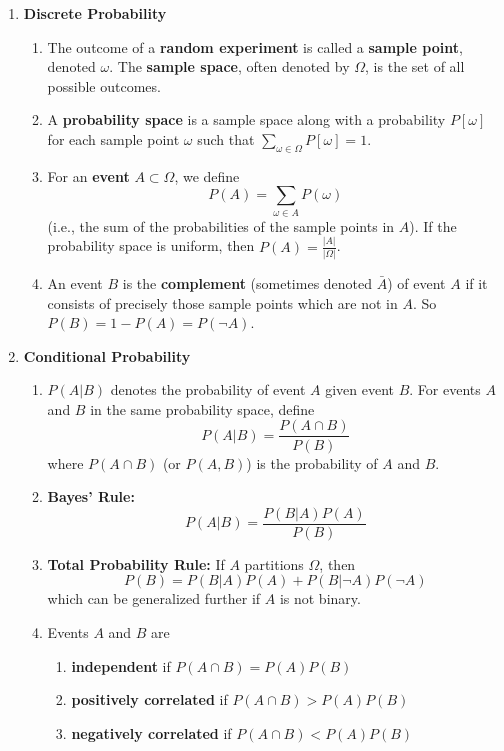 \documentclass[10pt]{article}
\begin{document}
\begin{multicols}{2}
\begin{enumerate}
\begin{enumerate}
        \end{enumerate}
        \item \textbf{Discrete Probability} 
        \begin{enumerate}
            \item The outcome of a \textbf{random experiment} is called a \textbf{sample point}, denoted $\omega$. The \textbf{sample space}, often denoted by $\Omega$, is the set of all possible outcomes.
            \item A \textbf{probability space} is a sample space along with a probability $P[\omega]$ for each sample point $\omega$ such that $\sum_{\omega \in \Omega} P[\omega]=1$.
            \item For an \textbf{event} $A \subset \Omega$, we define 
            $$P(A)=\sum_{\omega \in A} P(\omega)$$
            (i.e., the sum of the probabilities of the sample points in $A$). If the probability space is uniform, then $P(A)=\frac{|A|}{|\Omega|}$.
            \item An event $B$ is the \textbf{complement} (sometimes denoted $\bar{A}$) of event $A$ if it consists of precisely those sample points which are not in $A$. So $P(B) = 1 - P(A) = P(\neg A)$. 
        \end{enumerate}
        \item \textbf{Conditional Probability}
        \begin{enumerate}
            \item $P(A|B)$ denotes the probability of event $A$ given event $B$. For events $A$ and $B$ in the same probability space, define 
            $$P(A|B) = \frac{P(A \cap B)}{P(B)}$$
            where $P(A \cap B)$ (or $P(A,B)$) is the probability of $A$ and $B$.
            \item \textbf{Bayes' Rule:} $$P(A|B) = \frac{P(B|A)P(A)}{P(B)}$$
            \item \textbf{Total Probability Rule:} If $A$ partitions $\Omega$, then $$P(B)=P(B|A)P(A)+ P(B|\neg A)P(\neg A)$$ which can be generalized further if $A$ is not binary. 
            \item Events $A$ and $B$ are \begin{enumerate}
                \item \textbf{independent} if $P(A \cap B)=P(A)P(B)$
                \item \textbf{positively correlated} if $P(A \cap B)>P(A)P(B)$
                \item \textbf{negatively correlated} if $P(A \cap B)<P(A)P(B)$
            \end{enumerate}

\end{enumerate}
\end{enumerate}
\end{multicols}
\end{document}
